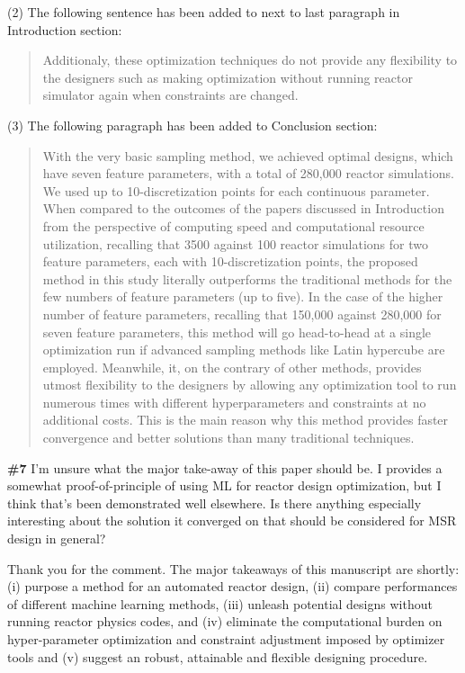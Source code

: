 \documentclass{ar2rc}
\begin{document}
    (2) The following sentence has been added to next to last paragraph in Introduction section:\\

    \begin{quote}
        Additionaly, these optimization techniques do not provide any flexibility to the designers such as making optimization without running reactor simulator again when constraints are changed.
    \end{quote}

    (3) The following paragraph has been added to Conclusion section:\\

    \begin{quote}
        With the very basic sampling method, we achieved optimal designs, which have seven feature parameters, with a total of 280,000 reactor simulations. We used up to 10-discretization points for each continuous parameter. When compared to the outcomes of the papers discussed in Introduction \cite{pereira1999, pereira2003} from the perspective of computing speed and computational resource utilization, recalling that 3500 against 100 reactor simulations for two feature parameters, each with 10-discretization points, the proposed method in this study literally outperforms the traditional methods for the few numbers of feature parameters (up to five). In the case of the higher number of feature parameters, recalling that 150,000 against 280,000 for seven feature parameters, this method will go head-to-head at a single optimization run if advanced sampling methods like Latin hypercube are employed. Meanwhile, it, on the contrary of other methods, provides utmost flexibility to the designers by allowing any optimization tool to run numerous times with different hyperparameters and constraints at no additional costs. This is the main reason why this method provides faster convergence and better solutions than many traditional techniques.
    \end{quote}


    \Comment \textbf{\#7} I'm unsure what the major take-away of this paper should be.  I
    provides a somewhat proof-of-principle of using ML for reactor design
    optimization, but I think that's been demonstrated well elsewhere.  Is
    there anything especially interesting about the solution it converged on
    that should be considered for MSR design in general?


    \Response Thank you for the comment. The major takeaways of this manuscript are shortly: (i) purpose a method for an automated reactor design, (ii) compare performances of different machine learning methods, (iii) unleash potential designs without running reactor physics codes, and (iv) eliminate the computational burden on hyper-parameter optimization and constraint adjustment imposed by optimizer tools and (v) suggest an robust, attainable and flexible designing procedure.
\end{document}
